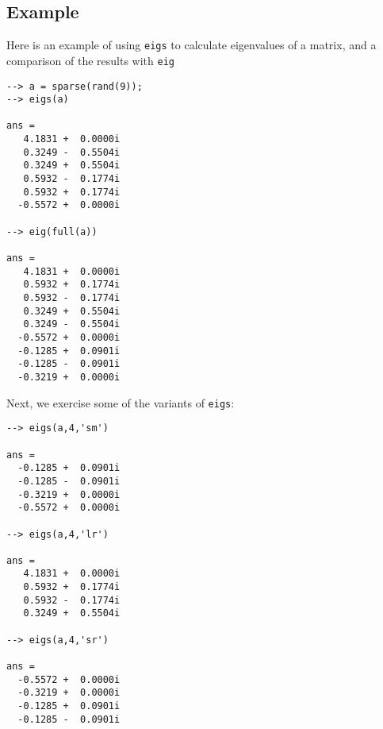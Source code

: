 \subsection{Example}

Here is an example of using \verb|eigs| to calculate eigenvalues
of a matrix, and a comparison of the results with \verb|eig|
\begin{verbatim}
--> a = sparse(rand(9));
--> eigs(a)

ans = 
   4.1831 +  0.0000i 
   0.3249 -  0.5504i 
   0.3249 +  0.5504i 
   0.5932 -  0.1774i 
   0.5932 +  0.1774i 
  -0.5572 +  0.0000i 

--> eig(full(a))

ans = 
   4.1831 +  0.0000i 
   0.5932 +  0.1774i 
   0.5932 -  0.1774i 
   0.3249 +  0.5504i 
   0.3249 -  0.5504i 
  -0.5572 +  0.0000i 
  -0.1285 +  0.0901i 
  -0.1285 -  0.0901i 
  -0.3219 +  0.0000i 
\end{verbatim}
Next, we exercise some of the variants of \verb|eigs|:
\begin{verbatim}
--> eigs(a,4,'sm')

ans = 
  -0.1285 +  0.0901i 
  -0.1285 -  0.0901i 
  -0.3219 +  0.0000i 
  -0.5572 +  0.0000i 

--> eigs(a,4,'lr')

ans = 
   4.1831 +  0.0000i 
   0.5932 +  0.1774i 
   0.5932 -  0.1774i 
   0.3249 +  0.5504i 

--> eigs(a,4,'sr')

ans = 
  -0.5572 +  0.0000i 
  -0.3219 +  0.0000i 
  -0.1285 +  0.0901i 
  -0.1285 -  0.0901i 
\end{verbatim}
